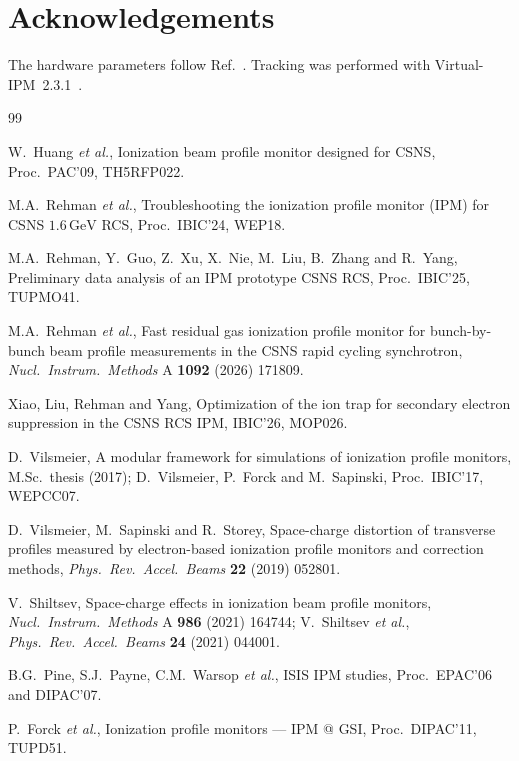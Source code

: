 \documentclass[hyperref]{cernrep}
\begin{document}
\section*{Acknowledgements}

The hardware parameters follow Ref.~\cite{Rehman2026}. Tracking was
performed with Virtual-IPM~2.3.1~\cite{Vilsmeier2017}.

\begin{thebibliography}{99}

W.~Huang \emph{et al.}, Ionization beam profile monitor designed for
CSNS, Proc.\ PAC'09, TH5RFP022.

M.A.~Rehman \emph{et al.}, Troubleshooting the ionization profile
monitor (IPM) for CSNS $1.6\,\mathrm{GeV}$ RCS, Proc.\ IBIC'24, WEP18.

M.A.~Rehman, Y.~Guo, Z.~Xu, X.~Nie, M.~Liu, B.~Zhang and R.~Yang,
Preliminary data analysis of an IPM prototype CSNS RCS, Proc.\ IBIC'25,
TUPMO41.

M.A.~Rehman \emph{et al.}, Fast residual gas ionization profile monitor
for bunch-by-bunch beam profile measurements in the CSNS rapid cycling
synchrotron, \emph{Nucl.\ Instrum.\ Methods} A \textbf{1092} (2026)
171809.

Xiao, Liu, Rehman and Yang, Optimization of the ion trap for secondary
electron suppression in the CSNS RCS IPM, IBIC'26, MOP026.

D.~Vilsmeier, A modular framework for simulations of ionization profile
monitors, M.Sc.\ thesis (2017);
D.~Vilsmeier, P.~Forck and M.~Sapinski, Proc.\ IBIC'17, WEPCC07.

D.~Vilsmeier, M.~Sapinski and R.~Storey, Space-charge distortion of
transverse profiles measured by electron-based ionization profile
monitors and correction methods, \emph{Phys.\ Rev.\ Accel.\ Beams}
\textbf{22} (2019) 052801.

V.~Shiltsev, Space-charge effects in ionization beam profile monitors,
\emph{Nucl.\ Instrum.\ Methods} A \textbf{986} (2021) 164744;
V.~Shiltsev \emph{et al.}, \emph{Phys.\ Rev.\ Accel.\ Beams}
\textbf{24} (2021) 044001.

B.G.~Pine, S.J.~Payne, C.M.~Warsop \emph{et al.}, ISIS IPM studies,
Proc.\ EPAC'06 and DIPAC'07.

P.~Forck \emph{et al.}, Ionization profile monitors --- IPM @ GSI,
Proc.\ DIPAC'11, TUPD51.


\end{thebibliography}
\end{document}
